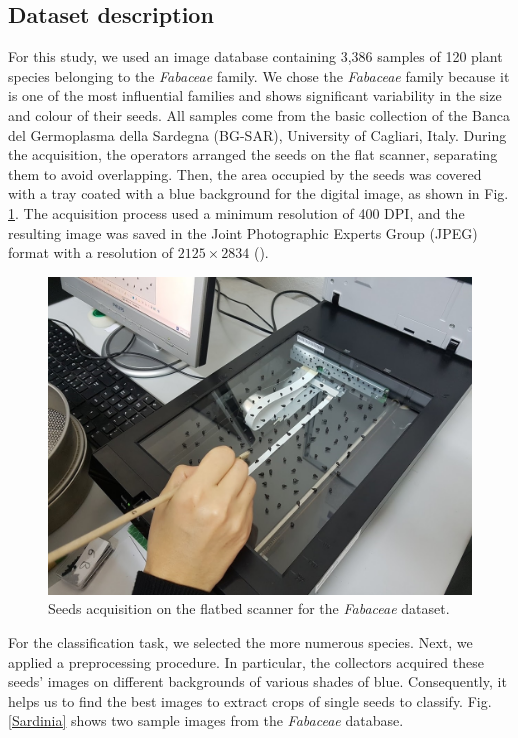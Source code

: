 \documentclass[twocolumn]{svjour3}           %
\begin{document}
\subsection{Dataset description}
\label{sec:dataset}
For this study, we used an image database containing 3,386 samples of 120 plant species belonging to the \emph{Fabaceae} family.
We chose the \emph{Fabaceae} family because it is one of the most influential families and shows significant variability in the size and colour of their seeds. All samples come from the basic collection of the Banca del Germoplasma della Sardegna (BG-SAR), University of Cagliari, Italy.
During the acquisition, the operators arranged the seeds on the flat scanner, separating them to avoid overlapping. Then, the area occupied by the seeds was covered with a tray coated with a blue background for the digital image, as shown in Fig. \ref{Acquisition}. The acquisition process used a minimum resolution of 400 DPI, and the resulting image was saved in the Joint Photographic Experts Group (JPEG) format with a resolution of $2125\times2834$ (\cite{Loddo20}).

\begin{figure}[tbp]
	\centerline{\includegraphics[scale=0.25]{fig_acquisition.jpg}}
	\caption{Seeds acquisition on the flatbed scanner for the \emph{Fabaceae} dataset.}
	\label{Acquisition}
\end{figure}

For the classification task, we selected the more numerous species.
Next, we applied a preprocessing procedure. 
In particular, the collectors acquired these seeds' images on different backgrounds of various shades of blue. Consequently, it helps us to find the best images to extract crops of single seeds to classify. Fig. \ref{Sardinia} shows two sample images from the \emph{Fabaceae} database.
\end{document}

